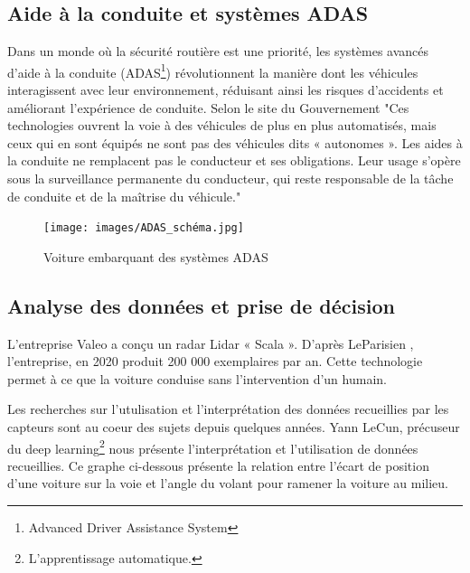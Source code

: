 \documentclass{article}
\begin{document}
\subsection{Aide à la conduite et systèmes ADAS}
Dans un monde où la sécurité routière est une priorité, les systèmes avancés d’aide à la conduite (ADAS\footnote{Advanced Driver Assistance System}) révolutionnent la manière dont les véhicules interagissent avec leur environnement, réduisant ainsi les risques d’accidents et améliorant l’expérience de conduite.
Selon le site du Gouvernement \cite{adas_gouv} "Ces technologies ouvrent la voie à des véhicules de plus en plus automatisés, mais ceux qui en sont équipés ne sont pas des véhicules dits « autonomes ». Les aides à la conduite ne remplacent pas le conducteur et ses obligations. Leur usage s’opère sous la surveillance permanente du conducteur, qui reste responsable de la tâche de conduite et de la maîtrise du véhicule."
\begin{figure}[h]
    \centering
    \texttt{[image: images/ADAS\_schéma.jpg]} 
    \caption{Voiture embarquant des systèmes ADAS\cite{continental_adas}}
\end{figure}




\subsection{Analyse des données et prise de décision}
L'entreprise Valeo a conçu un radar Lidar « Scala ». D'après LeParisien \cite{le_parisien_radar_2019}, l'entreprise, en 2020 produit 200 000 exemplaires par an. Cette technologie permet à ce que la voiture conduise sans l'intervention d'un humain.


Les recherches sur l'utulisation et l'interprétation des données recueillies par les capteurs sont au coeur des sujets depuis quelques années. Yann LeCun, précuseur du deep learning\footnote{L'apprentissage automatique.} nous présente l'interprétation et l'utilisation de données recueillies.
Ce graphe ci-dessous présente la relation entre l’écart de position d’une voiture sur la voie et l’angle du volant pour ramener la voiture au milieu. 
\end{document}
